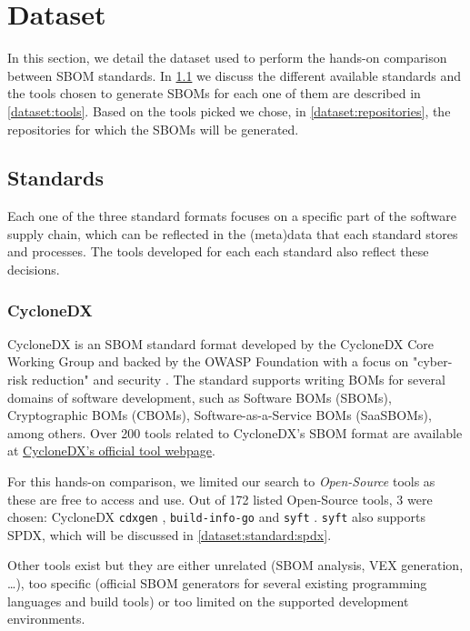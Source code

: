 \section{Dataset}

In this section, we detail the dataset used to perform the hands-on comparison between SBOM standards. In \ref{dataset:standards} we discuss the different available standards and the tools chosen to generate SBOMs for each one of them are described in \ref{dataset:tools}. Based on the tools picked we chose, in \ref{dataset:repositories}, the repositories for which the SBOMs will be generated.

\subsection{Standards} \label{dataset:standards}

Each one of the three standard formats focuses on a specific part of the software supply chain, which can be reflected in the (meta)data that each standard stores and processes. The tools developed for each each standard also reflect these decisions.

\subsubsection{CycloneDX} \label{dataset:standard:cdx}

CycloneDX \cite{standards:sbom:cyclonedx} is an SBOM standard format developed by the CycloneDX Core Working Group and backed by the OWASP Foundation with a focus on "cyber-risk reduction" \cite{standards:sbom:cyclonedx} and security \cite{article:sbom-study}. The standard supports writing BOMs for several domains of software development, such as Software BOMs (SBOMs), Cryptographic BOMs (CBOMs), Software-as-a-Service BOMs (SaaSBOMs), among others. Over 200 tools related to CycloneDX's SBOM format are available at \href{https://cyclonedx.org/tool-center/}{CycloneDX's official tool webpage}.

For this hands-on comparison, we limited our search to \emph{Open-Source} tools as these are free to access and use. Out of 172 listed Open-Source tools, 3 were chosen: CycloneDX \verb|cdxgen| \cite{repository:cyclonedx:cdxgen}, \verb|build-info-go| \cite{repository:cyclonedx:build-info-go} and \verb|syft| \cite{repository:cyclonedx:syft}. \verb|syft| also supports SPDX, which will be discussed in \ref{dataset:standard:spdx}.

Other tools exist but they are either unrelated (SBOM analysis, VEX generation, \dots), too specific (official SBOM generators for several existing programming languages and build tools) or too limited on the supported development environments.

